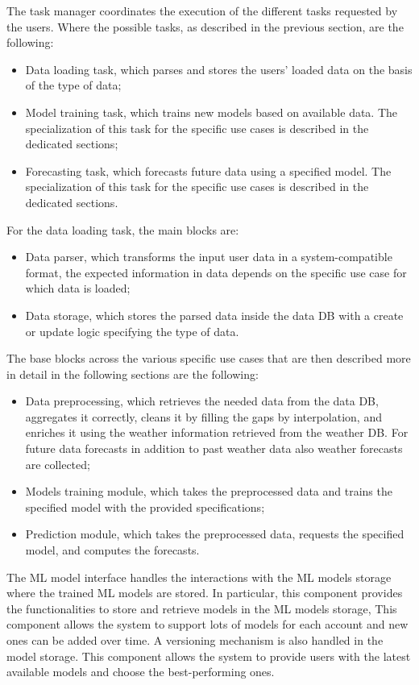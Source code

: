 The task manager coordinates the execution of the different tasks requested by the users.
Where the possible tasks, as described in the previous section, are the following:
\begin{itemize}
  \item Data loading task, which parses and stores the users' loaded data on the basis of the type of data;
  \item Model training task, which trains new models based on available data. The specialization of this task for the specific use cases is described in the dedicated sections;
  \item Forecasting task, which forecasts future data using a specified model. The specialization of this task for the specific use cases is described in the dedicated sections.
\end{itemize}

For the data loading task, the main blocks are:
\begin{itemize}
  \item Data parser, which transforms the input user data in a system-compatible format, the expected information in data depends on the specific use case for which data is loaded;
  \item Data storage, which stores the parsed data inside the data DB with a create or update logic specifying the type of data.
\end{itemize}

The base blocks across the various specific use cases that are then described more in detail in the following sections are the following:
\begin{itemize}
  \item Data preprocessing, which retrieves the needed data from the data DB, aggregates it correctly, cleans it by filling the gaps by interpolation, and enriches it using the weather information retrieved from the weather DB. For future data forecasts in addition to past weather data also weather forecasts are collected;
  \item Models training module, which takes the preprocessed data and trains the specified model with the provided specifications;
  \item Prediction module, which takes the preprocessed data, requests the specified model, and computes the forecasts.
\end{itemize}

The ML model interface handles the interactions with the ML models storage where the trained ML models are stored.
In particular, this component provides the functionalities to store and retrieve models in the ML models storage,
This component allows the system to support lots of models for each account and new ones can be added over time.
A versioning mechanism is also handled in the model storage.
This component allows the system to provide users with the latest available models and choose the best-performing ones.

